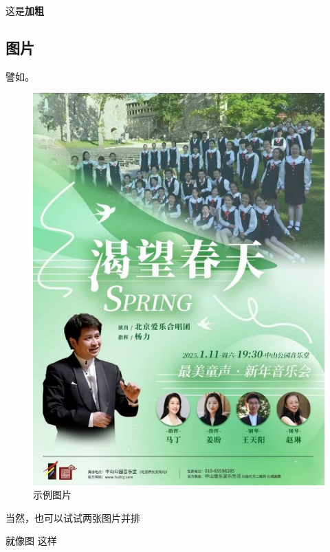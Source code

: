 \documentclass[12pt,a4paper,UTF8]{ctexart}
\begin{document}
这是\textbf{加粗}

\subsection{图片}

譬如。

\begin{figure}[!htbp]
    \centering
    \includegraphics[width =.5\textwidth]{figures/ex.png}
    \caption{示例图片}
    \label{I1}
\end{figure}

当然，也可以试试两张图片并排~

就像图  这样
\end{document}
